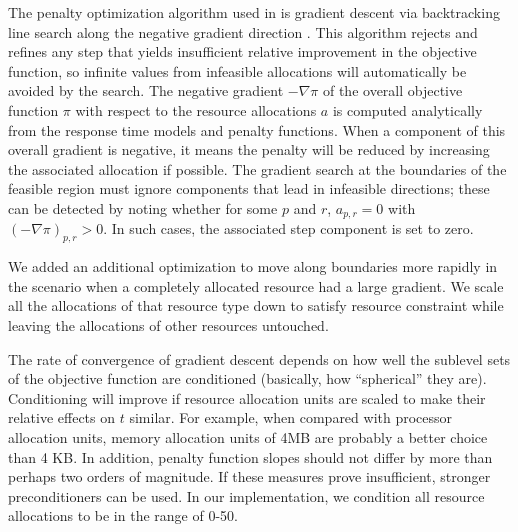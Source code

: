 The penalty optimization algorithm used in \pacora is gradient descent via backtracking line search along the negative gradient direction \cite{BoVa}.
This algorithm rejects and refines any step that yields insufficient relative improvement in the objective function,
so infinite values from infeasible allocations will automatically be avoided by the search.
The negative gradient $-\nabla\pi$ of the overall objective function $\pi$
with respect to the resource allocations $a$
is computed analytically from the response time models and penalty functions.
When a component of this overall gradient is negative,
it means the penalty will be reduced by increasing the associated allocation if possible.
The gradient search at the boundaries of the feasible region
must ignore components that lead in infeasible directions;
these can be detected by noting whether for some $p$ and $r$, $a_{p,r} = 0$ with $(-\nabla\pi)_{p,r} > 0$.
In such cases, the associated step component is set to zero.

We added an additional optimization to move along boundaries more rapidly in the scenario when a completely allocated resource had a large gradient.  We scale all the allocations of that resource type down to satisfy resource constraint while leaving the allocations of other resources untouched.

The rate of convergence of gradient descent depends on how well the sublevel sets of the objective function
are conditioned (basically, how ``spherical'' they are).
Conditioning will improve if resource allocation units are scaled to make their relative effects on $t$ similar.
For example, when compared with processor allocation units,
memory allocation units of 4MB are probably a better choice than 4 KB.
In addition, penalty function slopes should not differ by more than perhaps two orders of magnitude. If these measures prove insufficient, stronger preconditioners can be used. In our implementation, we condition all resource allocations to be in the range of 0-50.


